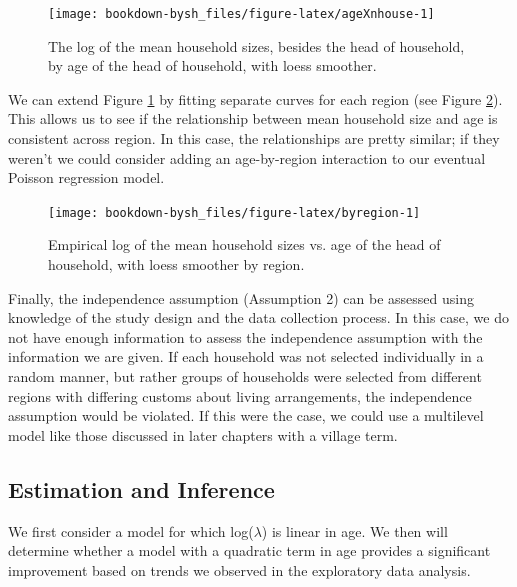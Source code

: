 \documentclass[
]{krantz}
\begin{document}
\begin{figure}

{\centering \texttt{[image: bookdown-bysh\_files/figure-latex/ageXnhouse-1]} 

}

\caption{The log of the mean household sizes, besides the head of household, by age of the head of household, with loess smoother.}\label{fig:ageXnhouse}
\end{figure}

We can extend Figure \ref{fig:ageXnhouse} by fitting separate curves for each region (see Figure \ref{fig:byregion}). This allows us to see if the relationship between mean household size and age is consistent across region. In this case, the relationships are pretty similar; if they weren't we could consider adding an age-by-region interaction to our eventual Poisson regression model.

\begin{figure}

{\centering \texttt{[image: bookdown-bysh\_files/figure-latex/byregion-1]} 

}

\caption{Empirical log of the mean household sizes vs. age of the head of household, with loess smoother by region.}\label{fig:byregion}
\end{figure}

Finally, the independence assumption (Assumption 2) can be assessed using knowledge of the study design and the data collection process. In this case, we do not have enough information to assess the independence assumption with the information we are given. If each household was not selected individually in a random manner, but rather groups of households were selected from different regions with differing customs about living arrangements, the independence assumption would be violated. If this were the case, we could use a multilevel model like those discussed in later chapters with a village term.

\hypertarget{sec-PoisInference}{%
\subsection{Estimation and Inference}\label{sec-PoisInference}}

We first consider a model for which log(\(\lambda\)) is linear in age. We then will determine whether a model with a quadratic term in age provides a significant improvement based on trends we observed in the exploratory data analysis.
\end{document}
